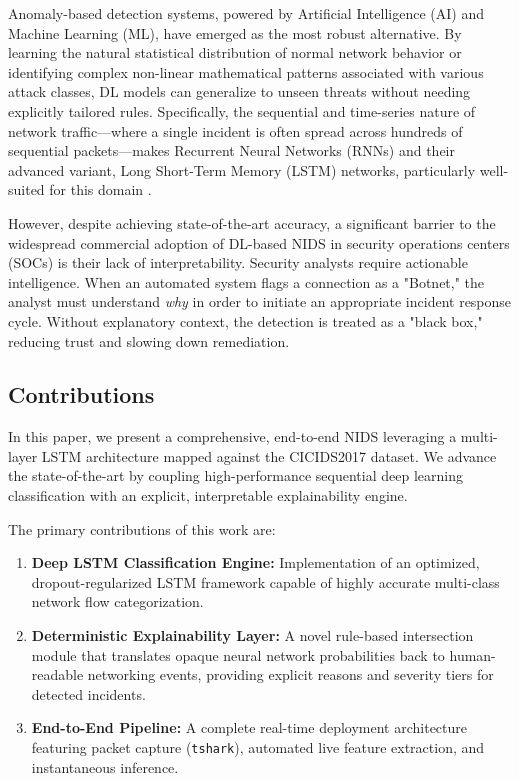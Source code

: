 \documentclass[conference]{IEEEtran}
\begin{document}
Anomaly-based detection systems, powered by Artificial Intelligence (AI) and Machine Learning (ML), have emerged as the most robust alternative. By learning the natural statistical distribution of normal network behavior or identifying complex non-linear mathematical patterns associated with various attack classes, DL models can generalize to unseen threats without needing explicitly tailored rules. Specifically, the sequential and time-series nature of network traffic—where a single incident is often spread across hundreds of sequential packets—makes Recurrent Neural Networks (RNNs) and their advanced variant, Long Short-Term Memory (LSTM) networks, particularly well-suited for this domain \cite{hochreiter1997}. 

However, despite achieving state-of-the-art accuracy, a significant barrier to the widespread commercial adoption of DL-based NIDS in security operations centers (SOCs) is their lack of interpretability. Security analysts require actionable intelligence. When an automated system flags a connection as a "Botnet," the analyst must understand \textit{why} in order to initiate an appropriate incident response cycle. Without explanatory context, the detection is treated as a "black box," reducing trust and slowing down remediation.

\subsection{Contributions}
In this paper, we present a comprehensive, end-to-end NIDS leveraging a multi-layer LSTM architecture mapped against the CICIDS2017 dataset. We advance the state-of-the-art by coupling high-performance sequential deep learning classification with an explicit, interpretable explainability engine. 

The primary contributions of this work are:
\begin{enumerate}
    \item \textbf{Deep LSTM Classification Engine:} Implementation of an optimized, dropout-regularized LSTM framework capable of highly accurate multi-class network flow categorization.
    \item \textbf{Deterministic Explainability Layer:} A novel rule-based intersection module that translates opaque neural network probabilities back to human-readable networking events, providing explicit reasons and severity tiers for detected incidents.
    \item \textbf{End-to-End Pipeline:} A complete real-time deployment architecture featuring packet capture (\texttt{tshark}), automated live feature extraction, and instantaneous inference.
\end{enumerate}
\end{document}
